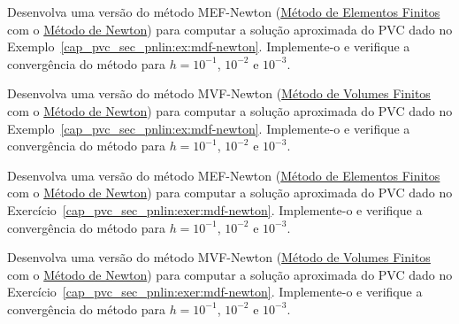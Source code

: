\begin{exer}
  Desenvolva uma versão do método MEF-Newton (\href{https://notaspedrok.com.br/notas/MatematicaNumericaII/cap_pvc_sec_fem.html}{Método de Elementos Finitos} com o \href{https://notaspedrok.com.br/notas/MatematicaNumericaI/cap_snl_sec_newton.html}{Método de Newton}) para computar a solução aproximada do PVC dado no Exemplo~\ref{cap_pvc_sec_pnlin:ex:mdf-newton}. Implemente-o e verifique a convergência do método para $h=10^{-1}$, $10^{-2}$ e $10^{-3}$.
\end{exer}

\begin{exer}
  Desenvolva uma versão do método MVF-Newton (\href{https://notaspedrok.com.br/notas/MatematicaNumericaII/cap_pvc_sec_mvf.html}{Método de Volumes Finitos} com o \href{https://notaspedrok.com.br/notas/MatematicaNumericaI/cap_snl_sec_newton.html}{Método de Newton}) para computar a solução aproximada do PVC dado no Exemplo~\ref{cap_pvc_sec_pnlin:ex:mdf-newton}. Implemente-o e verifique a convergência do método para $h=10^{-1}$, $10^{-2}$ e $10^{-3}$.
\end{exer}

\begin{exer}
  Desenvolva uma versão do método MEF-Newton (\href{https://notaspedrok.com.br/notas/MatematicaNumericaII/cap_pvc_sec_fem.html}{Método de Elementos Finitos} com o \href{https://notaspedrok.com.br/notas/MatematicaNumericaI/cap_snl_sec_newton.html}{Método de Newton}) para computar a solução aproximada do PVC dado no Exercício~\ref{cap_pvc_sec_pnlin:exer:mdf-newton}. Implemente-o e verifique a convergência do método para $h=10^{-1}$, $10^{-2}$ e $10^{-3}$.  
\end{exer}

\begin{exer}
  Desenvolva uma versão do método MVF-Newton (\href{https://notaspedrok.com.br/notas/MatematicaNumericaII/cap_pvc_sec_mvf.html}{Método de Volumes Finitos} com o \href{https://notaspedrok.com.br/notas/MatematicaNumericaI/cap_snl_sec_newton.html}{Método de Newton}) para computar a solução aproximada do PVC dado no Exercício~\ref{cap_pvc_sec_pnlin:exer:mdf-newton}. Implemente-o e verifique a convergência do método para $h=10^{-1}$, $10^{-2}$ e $10^{-3}$.
\end{exer}

